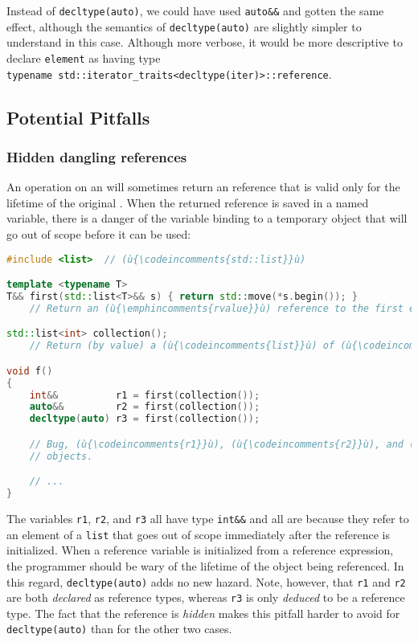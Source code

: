 Instead of \lstinline!decltype(auto)!, we could have used \lstinline!auto&&!
and gotten the same effect, although the semantics of
\lstinline!decltype(auto)! are slightly simpler to understand in this case.
Although more verbose, it would be more descriptive to declare
\lstinline!element! as having type
\lstinline!typename!~\lstinline!std::iterator_traits<decltype(iter)>::reference!.

\subsection[Potential Pitfalls]{Potential Pitfalls}\label{potential-pitfalls}

\subsubsection[Hidden dangling references]{Hidden dangling references}\label{hidden-dangling-references}

An operation on an  will sometimes return an 
reference that is valid only for the lifetime of the original
. When the returned reference is saved in a named variable,
there is a danger of the variable binding to a temporary object that
will go out of scope before it can be used:

\begin{lstlisting}[language=C++]
#include <list>  // (ù{\codeincomments{std::list}}ù)

template <typename T>
T&& first(std::list<T>&& s) { return std::move(*s.begin()); }
    // Return an (ù{\emphincomments{rvalue}}ù) reference to the first element in (ù{\codeincomments{s}}ù).

std::list<int> collection();
    // Return (by value) a (ù{\codeincomments{list}}ù) of (ù{\codeincomments{int}}ù) values.

void f()
{
    int&&          r1 = first(collection());
    auto&&         r2 = first(collection());
    decltype(auto) r3 = first(collection());

    // Bug, (ù{\codeincomments{r1}}ù), (ù{\codeincomments{r2}}ù), and (ù{\codeincomments{r3}}ù) are all dangling references to destroyed
    // objects.

    // ...
}
\end{lstlisting}
    

The variables \lstinline!r1!, \lstinline!r2!, and \lstinline!r3! all have type
\lstinline!int&&! and all are  because they
refer to an element of a \lstinline!list! that goes out of scope
immediately after the reference is initialized. When a reference
variable is initialized from a reference expression, the programmer
should be wary of the lifetime of the object being referenced. In this
regard, \lstinline!decltype(auto)! adds no new hazard. Note, however, that
\lstinline!r1! and \lstinline!r2! are both \emph{declared} as reference types,
whereas \lstinline!r3! is only \emph{deduced} to be a reference type. The
fact that the reference is \emph{hidden} makes this pitfall harder to
avoid for \lstinline!decltype(auto)! than for the other two cases.

